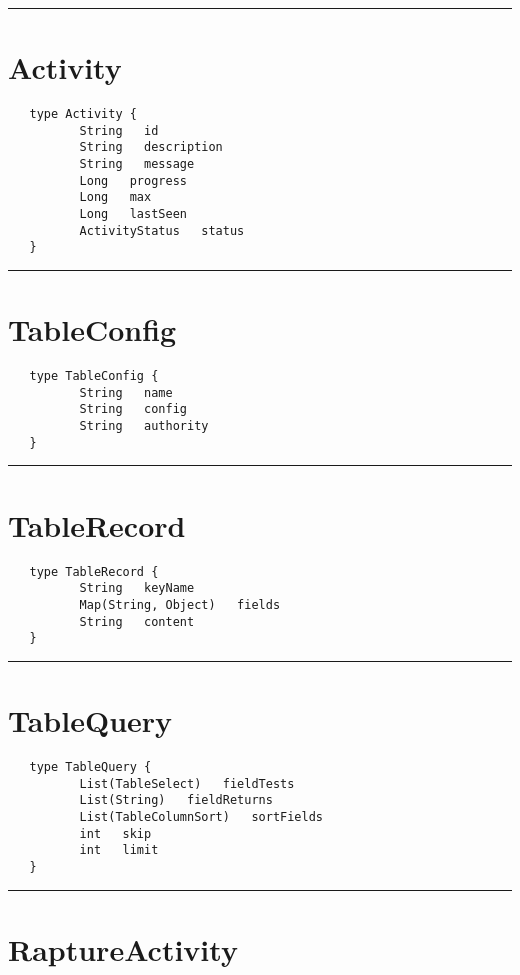 \rule{12cm}{2pt}
\section{Activity}
\label{type:Activity}

\begin{Verbatim}
   type Activity {
          String   id
          String   description
          String   message
          Long   progress
          Long   max
          Long   lastSeen
          ActivityStatus   status
   }
\end{Verbatim}

\rule{12cm}{2pt}
\section{TableConfig}
\label{type:TableConfig}

\begin{Verbatim}
   type TableConfig {
          String   name
          String   config
          String   authority
   }
\end{Verbatim}

\rule{12cm}{2pt}
\section{TableRecord}
\label{type:TableRecord}

\begin{Verbatim}
   type TableRecord {
          String   keyName
          Map(String, Object)   fields
          String   content
   }
\end{Verbatim}

\rule{12cm}{2pt}
\section{TableQuery}
\label{type:TableQuery}

\begin{Verbatim}
   type TableQuery {
          List(TableSelect)   fieldTests
          List(String)   fieldReturns
          List(TableColumnSort)   sortFields
          int   skip
          int   limit
   }
\end{Verbatim}

\rule{12cm}{2pt}
\section{RaptureActivity}
\label{type:RaptureActivity}

